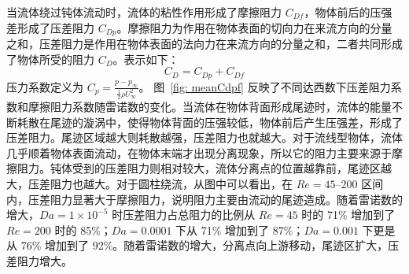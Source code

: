 

当流体绕过钝体流动时，流体的粘性作用形成了摩擦阻力 $C_{Df}$，物体前后的压强差形成了压差阻力 $C_{Dp}$。摩擦阻力为作用在物体表面的切向力在来流方向的分量之和，压差阻力是作用在物体表面的法向力在来流方向的分量之和，二者共同形成了物体所受的阻力 $C_{D}$。表示如下：
\begin{equation}
	C_D = C_{Dp} + C_{Df}
\end{equation}
压力系数定义为 $C_p = \frac{p-p_{\infty}}{\frac12\rho U_{\infty}^2}$。
图~\ref{fig: meanCdpf} 反映了不同达西数下压差阻力系数和摩擦阻力系数随雷诺数的变化。当流体在物体背面形成尾迹时，流体的能量不断耗散在尾迹的漩涡中，使得物体背面的压强较低，物体前后产生压强差，形成了压差阻力。尾迹区域越大则耗散越强，压差阻力也就越大。对于流线型物体，流体几乎顺着物体表面流动，在物体末端才出现分离现象，所以它的阻力主要来源于摩擦阻力。钝体受到的压差阻力则相对较大，流体分离点的位置越靠前，尾迹区越大，压差阻力也越大。对于圆柱绕流，从图中可以看出，在 $Re=45$--$200$ 区间内，压差阻力显著大于摩擦阻力，说明阻力主要由流动的尾迹造成。随着雷诺数的增大，$Da=1\times 10^{-5}$ 时压差阻力占总阻力的比例从 $Re=45$ 时的 71\% 增加到了 $Re=200$ 时的 85\%；$Da=0.0001$ 下从 71\% 增加到了 87\%；$Da=0.001$ 下更是从 76\% 增加到了 92\%。随着雷诺数的增大，分离点向上游移动，尾迹区扩大，压差阻力增大。%


